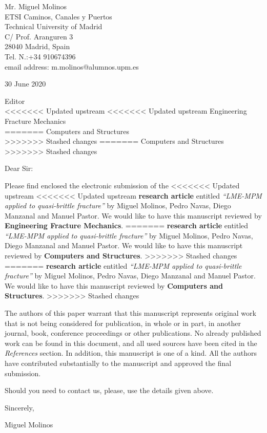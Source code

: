 \documentclass[10pt]{letter}
\begin{document}
Mr. Miguel Molinos\\
ETSI Caminos, Canales y Puertos\\
Technical University of Madrid\\
C/ Prof. Aranguren 3\\
28040 Madrid, Spain\\
Tel. N.:+34 910674396\\
email address: m.molinos@alumnos.upm.es\\

\vspace{.2in}

30 June 2020

\vspace{.3in}

Editor\\
<<<<<<< Updated upstream
<<<<<<< Updated upstream
Engineering Fracture Mechanics\\
=======
Computers and Structures\\
>>>>>>> Stashed changes
=======
Computers and Structures\\
>>>>>>> Stashed changes



Dear Sir:

\vspace{.2in}

Please find enclosed the electronic submission of the
<<<<<<< Updated upstream
<<<<<<< Updated upstream
\textbf{research article} entitled \textit{``LME-MPM applied to
  quasi-brittle fracture''} by Miguel Molinos, Pedro Navas, Diego
Manzanal and Manuel Pastor. We would like to have this manuscript
reviewed by \textbf{Engineering Fracture Mechanics}. 
=======
\textbf{research article} entitled \textit{``LME-MPM applied to quasi-brittle fracture''} by Miguel Molinos, Pedro Navas, Diego Manzanal and Manuel Pastor. We would like to have this manuscript reviewed by \textbf{Computers and Structures}.
>>>>>>> Stashed changes
=======
\textbf{research article} entitled \textit{``LME-MPM applied to quasi-brittle fracture''} by Miguel Molinos, Pedro Navas, Diego Manzanal and Manuel Pastor. We would like to have this manuscript reviewed by \textbf{Computers and Structures}.
>>>>>>> Stashed changes

The authors of this paper warrant that this manuscript represents
original work that is not being considered for publication, in
whole or in part, in another journal, book, conference proceedings
or other publications. No already published work can be found in
this document, and all used sources have been cited in the
\textit{References} section. In addition, this manuscript is one
of a kind. All the authors have contributed substantially to the
manuscript and approved the final submission.

Should you need to contact us, please, use the details given above.



\vspace{.1in}

Sincerely,

\vspace{.3in}

Miguel Molinos
\end{document}
